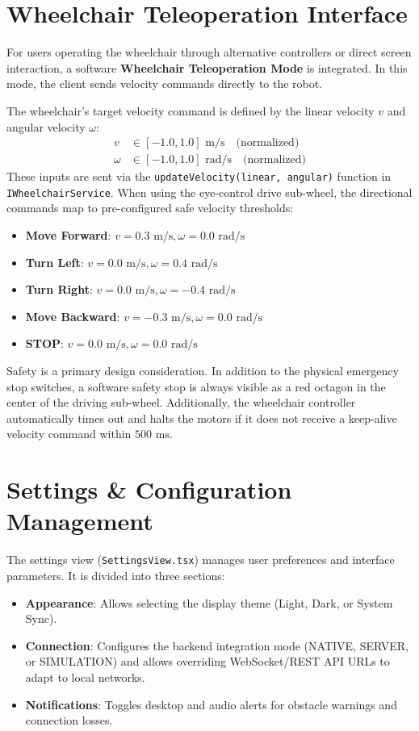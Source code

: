 \section{Wheelchair Teleoperation Interface}
For users operating the wheelchair through alternative controllers or direct screen interaction, a software \textbf{Wheelchair Teleoperation Mode} is integrated. In this mode, the client sends velocity commands directly to the robot.

The wheelchair's target velocity command is defined by the linear velocity $v$ and angular velocity $\omega$:
\begin{align}
v &\in [-1.0, 1.0]\text{ m/s} \quad \text{(normalized)} \\
\omega &\in [-1.0, 1.0]\text{ rad/s} \quad \text{(normalized)}
\end{align}
These inputs are sent via the \texttt{updateVelocity(linear, angular)} function in \texttt{IWheelchairService}.
When using the eye-control drive sub-wheel, the directional commands map to pre-configured safe velocity thresholds:
\begin{itemize}
    \item \textbf{Move Forward}: $v = 0.3\text{ m/s}, \omega = 0.0\text{ rad/s}$
    \item \textbf{Turn Left}: $v = 0.0\text{ m/s}, \omega = 0.4\text{ rad/s}$
    \item \textbf{Turn Right}: $v = 0.0\text{ m/s}, \omega = -0.4\text{ rad/s}$
    \item \textbf{Move Backward}: $v = -0.3\text{ m/s}, \omega = 0.0\text{ rad/s}$
    \item \textbf{STOP}: $v = 0.0\text{ m/s}, \omega = 0.0\text{ rad/s}$
\end{itemize}



Safety is a primary design consideration. In addition to the physical emergency stop switches, a software safety stop is always visible as a red octagon in the center of the driving sub-wheel. Additionally, the wheelchair controller automatically times out and halts the motors if it does not receive a keep-alive velocity command within $500\text{ ms}$.

\section{Settings \& Configuration Management}
The settings view (\texttt{SettingsView.tsx}) manages user preferences and interface parameters.
It is divided into three sections:
\begin{itemize}
    \item \textbf{Appearance}: Allows selecting the display theme (Light, Dark, or System Sync).
    \item \textbf{Connection}: Configures the backend integration mode (NATIVE, SERVER, or SIMULATION) and allows overriding WebSocket/REST API URLs to adapt to local networks.
    \item \textbf{Notifications}: Toggles desktop and audio alerts for obstacle warnings and connection losses.
\end{itemize}

